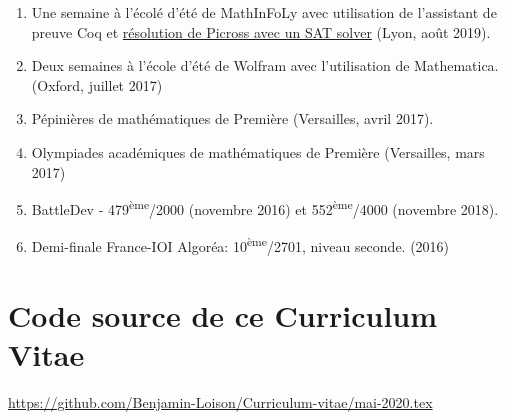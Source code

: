 \documentclass{article}
\begin{document}
		\begin{enumerate}
			
			\item Une semaine à l'écolé d'été de MathInFoLy avec utilisation de l'assistant de preuve Coq et \href{https://github.com/Benjamin-Loison/MathInFoLy19}{résolution de Picross avec un SAT solver} (Lyon, août 2019).
			
			\item Deux semaines à l'école d'été de Wolfram avec l'utilisation de Mathematica. (Oxford, juillet 2017)
			
			\item Pépinières de mathématiques de Première (Versailles, avril 2017).
			
			\item Olympiades académiques de mathématiques de Première (Versailles, mars 2017)
			
			\item BattleDev - 479\textsuperscript{ème}/2000 (novembre 2016) et 552\textsuperscript{ème}/4000 (novembre 2018).
			
			\item Demi-finale France-IOI Algoréa: 10\textsuperscript{ème}/2701, niveau seconde. (2016)

		\end{enumerate}
		
		\section{Code source de ce Curriculum Vitae}
	
		\href{https://github.com/Benjamin-Loison/Curriculum-vitae/mai-2020.tex}{https://github.com/Benjamin-Loison/Curriculum-vitae/mai-2020.tex}
	
\end{document}
